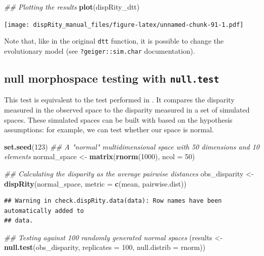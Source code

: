 \documentclass[
]{book}
\newenvironment{Shaded}{\begin{snugshade}}{\end{snugshade}}
\newcommand{\CommentTok}[1]{\textcolor[rgb]{0.56,0.35,0.01}{\textit{#1}}}
\newcommand{\DataTypeTok}[1]{\textcolor[rgb]{0.13,0.29,0.53}{#1}}
\newcommand{\DecValTok}[1]{\textcolor[rgb]{0.00,0.00,0.81}{#1}}
\newcommand{\KeywordTok}[1]{\textcolor[rgb]{0.13,0.29,0.53}{\textbf{#1}}}
\newcommand{\NormalTok}[1]{#1}
\newcommand{\StringTok}[1]{\textcolor[rgb]{0.31,0.60,0.02}{#1}}
\begin{document}
\begin{Shaded}
\begin{Highlighting}[]
\CommentTok{\#\# Plotting the results}
\KeywordTok{plot}\NormalTok{(dispRity\_dtt)}
\end{Highlighting}
\end{Shaded}

\texttt{[image: dispRity\_manual\_files/figure-latex/unnamed-chunk-91-1.pdf]}

Note that, like in the original \texttt{dtt} function, it is possible to change the evolutionary model (see \texttt{?geiger::sim.char} documentation).

\hypertarget{null-test}{%
\subsection{\texorpdfstring{null morphospace testing with \texttt{null.test}}{null morphospace testing with null.test}}\label{null-test}}

This test is equivalent to the test performed in \citet{diaz2016global}.
It compares the disparity measured in the observed space to the disparity measured in a set of simulated spaces.
These simulated spaces can be built with based on the hypothesis assumptions: for example, we can test whether our space is normal.

\begin{Shaded}
\begin{Highlighting}[]
\KeywordTok{set.seed}\NormalTok{(}\DecValTok{123}\NormalTok{)}
\CommentTok{\#\# A "normal" multidimensional space with 50 dimensions and 10 elements}
\NormalTok{normal\_space \textless{}{-}}\StringTok{ }\KeywordTok{matrix}\NormalTok{(}\KeywordTok{rnorm}\NormalTok{(}\DecValTok{1000}\NormalTok{), }\DataTypeTok{ncol =} \DecValTok{50}\NormalTok{)}

\CommentTok{\#\# Calculating the disparity as the average pairwise distances}
\NormalTok{obs\_disparity \textless{}{-}}\StringTok{ }\KeywordTok{dispRity}\NormalTok{(normal\_space,}
                          \DataTypeTok{metric =} \KeywordTok{c}\NormalTok{(mean, pairwise.dist))}
\end{Highlighting}
\end{Shaded}

\begin{verbatim}
## Warning in check.dispRity.data(data): Row names have been automatically added to
## data.
\end{verbatim}

\begin{Shaded}
\begin{Highlighting}[]
\CommentTok{\#\# Testing against 100 randomly generated normal spaces}
\NormalTok{(results \textless{}{-}}\StringTok{ }\KeywordTok{null.test}\NormalTok{(obs\_disparity, }\DataTypeTok{replicates =} \DecValTok{100}\NormalTok{,}
                      \DataTypeTok{null.distrib =}\NormalTok{ rnorm))}
\end{Highlighting}
\end{Shaded}
\end{document}
